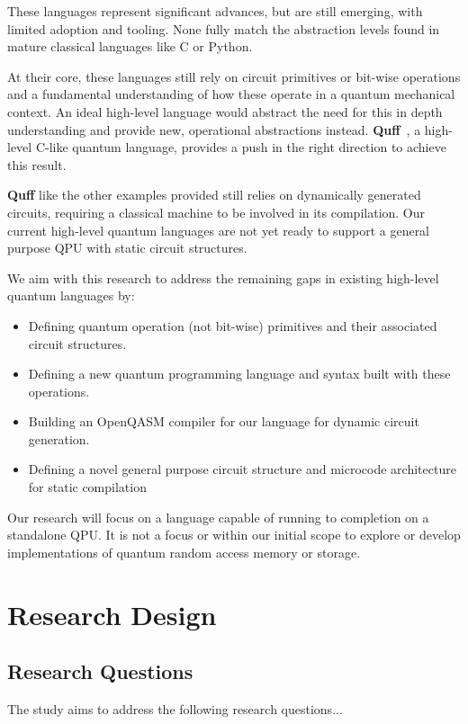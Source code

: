 \documentclass[journal,onecolumn, compsoc]{IEEEtran}
\begin{document}
These languages represent significant advances, but are still emerging, with limited adoption and tooling. None fully match the abstraction levels found in mature classical languages like C or Python.

At their core, these languages still rely on circuit primitives or bit-wise operations and a fundamental understanding of how these operate in a quantum mechanical context.
An ideal high-level language would abstract the need for this in depth understanding and provide new, operational abstractions instead.
\textbf{Quff}~\cite{quff2024}, a high-level C-like quantum language, provides a push in the right direction to achieve this result. 

\textbf{Quff} like the other examples provided still relies on dynamically generated circuits, requiring a classical machine to be involved in its compilation.
Our current high-level quantum languages are not yet ready to support a general purpose QPU with static circuit structures.

We aim with this research to address the remaining gaps in existing high-level quantum languages by:
\begin{itemize}
    \item Defining quantum operation (not bit-wise) primitives and their associated circuit structures.
    \item Defining a new quantum programming language and syntax built with these operations.
    \item Building an OpenQASM compiler for our language for dynamic circuit generation.
    \item Defining a novel general purpose circuit structure and microcode architecture for static compilation
\end{itemize}

Our research will focus on a language capable of running to completion on a standalone QPU. 
It is not a focus or within our initial scope to explore or develop implementations of quantum random access memory or storage.

\section{Research Design}
\subsection{Research Questions}
The study aims to address the following research questions...
\end{document}
